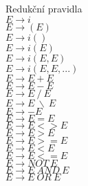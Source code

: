 \newpage
Redukční pravidla\\

{\large
$E \to i$\\
$E \to (E)$\\
$E \to i()$\\
$E \to i(E)$\\
$E \to i(E, E)$\\
$E \to i(E, E, ...)$\\
$E \to E + E$\\
$E \to E - E$\\
$E \to E ~ / ~ E$\\
$E \to E ~ \backslash ~ E$\\
$E \to - E$\\
$E \to E = E$\\
$E \to E <> E$\\
$E \to E > E$\\
$E \to E >= E$\\
$E \to E < E$\\
$E \to E <= E$\\
$E \to NOT ~ E$\\
$E \to E ~ AND ~ E$\\
$E \to E ~ OR ~ E$\\
}